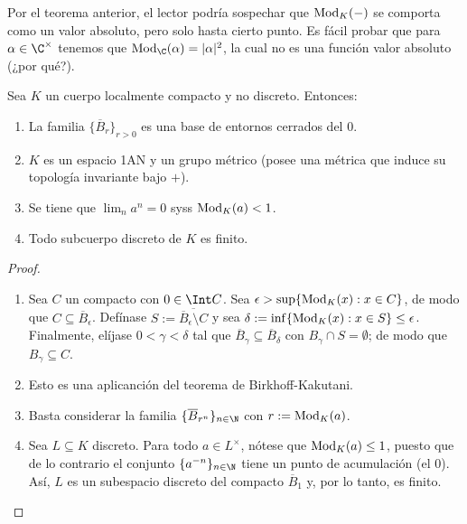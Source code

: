 \documentclass[teoria-numeros.tex]{subfiles}
\begin{document}
Por el teorema anterior, el lector podría sospechar que $\operatorname{Mod}_K(-)$ se comporta como un valor absoluto, pero solo hasta cierto punto.
Es fácil probar que para $\alpha \in \C^\times$ tenemos que $\Mod_\C(\alpha) = |\alpha|^2$, la cual no es una función valor absoluto (¿por qué?).

\begin{cor}
	Sea $K$ un cuerpo localmente compacto y no discreto.
	Entonces:
	\begin{enumerate}
		\item La familia $\{ \overline{B}_r \}_{r > 0}$ es una base de entornos cerrados del 0.
		\item $K$ es un espacio 1AN y un grupo métrico (posee una métrica que induce su topología invariante bajo $+$).
		\item Se tiene que $\lim_n a^n = 0$ syss $\operatorname{Mod}_K(a) < 1$.
		\item Todo subcuerpo discreto de $K$ es finito.
	\end{enumerate}
\end{cor}
\begin{proof}
	\begin{enumerate}
		\item Sea $C$ un compacto con $0 \in \Int C$.
			Sea $\epsilon > \sup\{ \operatorname{Mod}_K(x) : x \in C \}$, de modo que $C \subseteq \overline{B}_\epsilon$.
			Defínase $S := \overline{\overline{B}_\epsilon \setminus C}$ y sea $\delta := \inf\{ \operatorname{Mod}_K(x) : x \in S \} \le \epsilon$.
			Finalmente, elíjase $0 < \gamma < \delta$ tal que $\overline{B}_\gamma \subseteq \overline{B}_\delta$ con $B_\gamma \cap S = \emptyset$;
			de modo que $B_\gamma \subseteq C$.

		\item Esto es una aplicanción del teorema de Birkhoff-Kakutani.
		\item Basta considerar la familia $\{ \overline{B}_{r^n} \}_{n \in \N}$ con $r := \operatorname{Mod}_K(a)$.
		\item Sea $L \subseteq K$ discreto.
			Para todo $a \in L^\times$, nótese que $\operatorname{Mod}_K(a) \le 1$, puesto que de lo contrario el conjunto $\{ a^{-n} \}_{n\in\N}$
			tiene un punto de acumulación (el 0).
			Así, $L$ es un subespacio discreto del compacto $\overline{B}_1$ y, por lo tanto, es finito. \qedhere
	\end{enumerate}
\end{proof}
\end{document}
